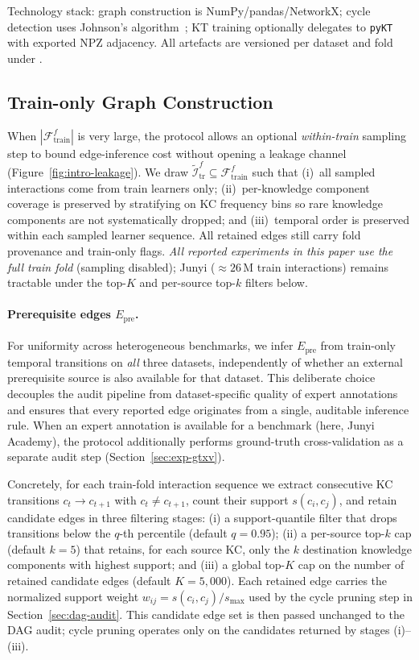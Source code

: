 \documentclass[pdflatex,sn-mathphys-num]{sn-jnl}
\newcommand{\Epre}{\ensuremath{E_{\text{pre}}}}
\newcommand{\KC}{knowledge component}
\newcommand{\KCs}{knowledge components}
\begin{document}
Technology stack: graph construction is NumPy/pandas/NetworkX; cycle
detection uses Johnson's algorithm~\cite{johnson1975finding}; KT training
optionally delegates to \texttt{pyKT}~\cite{liu2022pykt} with exported
NPZ adjacency. All artefacts are versioned per dataset and fold under
.

\subsection{Train-only Graph Construction}
\label{sec:graph}
When $|\mathcal{F}^f_{\text{train}}|$ is very large, the protocol allows
an optional \emph{within-train} sampling step to bound edge-inference cost
without opening a leakage channel (Figure~\ref{fig:intro-leakage}).
We draw $\tilde{\mathcal{I}}^f_{\text{tr}}\subseteq\mathcal{F}^f_{\text{train}}$
such that (i)~all sampled interactions come from train learners only;
(ii)~per-\KC{} coverage is preserved by stratifying on KC frequency bins so
rare \KCs{} are not systematically dropped; and (iii)~temporal order is
preserved within each sampled learner sequence. All retained edges still
carry fold provenance and train-only flags. \emph{All reported experiments
in this paper use the full train fold} (sampling disabled); Junyi
(${\approx}26$\,M train interactions) remains tractable under the
top-$K$ and per-source top-$k$ filters below.

\paragraph{Prerequisite edges $\Epre$.}
For uniformity across heterogeneous benchmarks, we infer $\Epre$ from
train-only temporal transitions on \emph{all} three datasets,
independently of whether an external prerequisite source is also
available for that dataset. This deliberate choice decouples the audit
pipeline from dataset-specific quality of expert annotations and
ensures that every reported edge originates from a single, auditable
inference rule. When an expert annotation is available for a benchmark
(here, Junyi Academy), the protocol additionally performs ground-truth
cross-validation as a separate audit step (Section~\ref{sec:exp-gtxv}).

Concretely, for each train-fold interaction sequence we extract
consecutive KC transitions $c_{t} \rightarrow c_{t+1}$ with
$c_{t} \neq c_{t+1}$, count their support $s(c_i, c_j)$, and retain
candidate edges in three filtering stages:
(i) a support-quantile filter that drops transitions below the
$q$-th percentile (default $q = 0.95$);
(ii) a per-source top-$k$ cap (default $k = 5$) that retains, for each
source KC, only the $k$ destination \KCs{} with highest support; and
(iii) a global top-$K$ cap on the number of retained candidate edges
(default $K = 5{,}000$). Each retained edge carries the normalized
support weight $w_{ij} = s(c_i, c_j) / s_{\max}$ used by the cycle
pruning step in Section~\ref{sec:dag-audit}. This candidate edge set
is then passed unchanged to the DAG audit; cycle pruning operates only
on the candidates returned by stages (i)--(iii).
\end{document}

